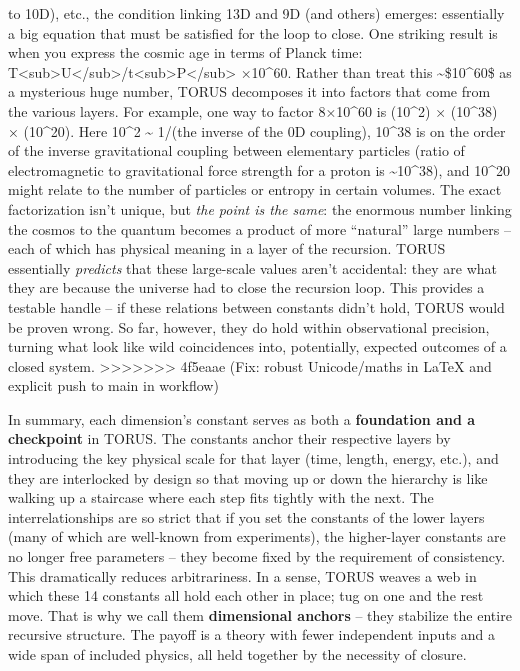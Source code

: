 \documentclass[]{article}
\begin{document}
\begin{itemize}
  to 10D), etc., the condition linking 13D and 9D (and others) emerges:
  essentially a big equation that must be satisfied for the loop to
  close. One striking result is when you express the cosmic age in terms
  of Planck time:
  T\textless{}sub\textgreater{}U\textless{}/sub\textgreater{}/t\textless{}sub\textgreater{}P\textless{}/sub\textgreater{}
  ×10\^{}60​. Rather than treat this \textasciitilde{}\$10\^{}60\$ as
  a mysterious huge number, TORUS decomposes it into factors that come
  from the various layers​. For example, one way to factor 8×10\^{}60 is
  (10\^{}2) × (10\^{}38) × (10\^{}20)​. Here 10\^{}2 \textasciitilde{}
  1/\alpha (the inverse of the 0D coupling), 10\^{}38 is on the order of the
  inverse gravitational coupling between elementary particles (ratio of
  electromagnetic to gravitational force strength for a proton is
  \textasciitilde{}10\^{}38), and 10\^{}20 might relate to the number of
  particles or entropy in certain volumes​. The exact factorization
  isn't unique, but \emph{the point is the same}: the enormous number
  linking the cosmos to the quantum becomes a product of more
  ``natural'' large numbers -- each of which has physical meaning in a
  layer of the recursion​. TORUS essentially \emph{predicts} that these
  large-scale values aren't accidental: they are what they are because
  the universe had to close the recursion loop. This provides a testable
  handle -- if these relations between constants didn't hold, TORUS
  would be proven wrong​. So far, however, they do hold within
  observational precision, turning what look like wild coincidences
  into, potentially, expected outcomes of a closed system.
>>>>>>> 4f5eaae (Fix: robust Unicode/maths in LaTeX and explicit push to main in workflow)
\end{itemize}

In summary, each dimension's constant serves as both a
\textbf{foundation and a checkpoint} in TORUS. The constants anchor
their respective layers by introducing the key physical scale for that
layer (time, length, energy, etc.), and they are interlocked by design
so that moving up or down the hierarchy is like walking up a staircase
where each step fits tightly with the next. The interrelationships are
so strict that if you set the constants of the lower layers (many of
which are well-known from experiments), the higher-layer constants are
no longer free parameters -- they become fixed by the requirement of
consistency​. This dramatically reduces arbitrariness. In a sense, TORUS
weaves a web in which these 14 constants all hold each other in place;
tug on one and the rest move. That is why we call them
\textbf{dimensional anchors} -- they stabilize the entire recursive
structure. The payoff is a theory with fewer independent inputs and a
wide span of included physics, all held together by the necessity of
closure.
\end{document}
